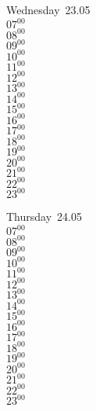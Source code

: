\documentclass[11pt, a4paper]{book}\usepackage[]{graphicx}\usepackage[]{color}
\begin{document}
\begin{weekdaybox}
  Wednesday~23.05\\
  { 
  \vfill
  $07^{00}$\\
$08^{00}$\\
$09^{00}$\\
$10^{00}$\\
$11^{00}$\\
$12^{00}$\\
$13^{00}$\\
$14^{00}$\\
$15^{00}$\\
$16^{00}$\\
$17^{00}$\\
$18^{00}$\\
$19^{00}$\\
$20^{00}$\\
$21^{00}$\\
$22^{00}$\\
$23^{00}$\\
  }
\end{weekdaybox}
\clearpage
\begin{headerbox}
\end{headerbox}
\begin{weekdaybox}
  Thursday~24.05\\
  { 
  \vfill
  $07^{00}$\\
$08^{00}$\\
$09^{00}$\\
$10^{00}$\\
$11^{00}$\\
$12^{00}$\\
$13^{00}$\\
$14^{00}$\\
$15^{00}$\\
$16^{00}$\\
$17^{00}$\\
$18^{00}$\\
$19^{00}$\\
$20^{00}$\\
$21^{00}$\\
$22^{00}$\\
$23^{00}$\\
  }
\end{weekdaybox} 
\end{document}

